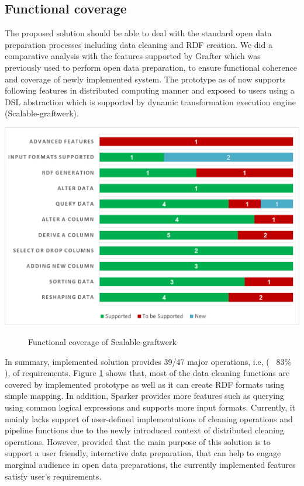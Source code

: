 \subsection{Functional coverage}
The proposed solution should be able to deal with the standard open data preparation processes including data cleaning and RDF creation. We did a comparative analysis with the features supported by Grafter which was previously used to perform open data preparation, to ensure functional coherence and coverage of newly implemented system.  The prototype as of now supports following features in distributed computing manner and exposed to users using a DSL abstraction which is supported by dynamic transformation execution engine (Scalable-graftwerk). 
\begin{center}
	\includegraphics[width=38em]{./Figures/functional-coverage-new}
	\begin{figure}[htbp]
    \caption{Functional coverage of Scalable-graftwerk}
    \label{fig:func-coverage}
	\end{figure}
\end{center}
 In summary, implemented solution provides 39/47 major operations, i.e, ( ~83\% ), of requirements. Figure \ref{fig:func-coverage} shows that, most of the data cleaning functions are covered by implemented prototype as well as it can create RDF formats using simple mapping. In addition, Sparker provides more features such as querying using common logical expressions and supports more input formats.   Currently, it mainly lacks support of user-defined implementations of cleaning operations and pipeline functions due to the newly introduced context of distributed cleaning operations. However, provided that the main purpose of this solution is to support a user friendly, interactive data preparation, that can help to engage marginal audience in open data preparations, the currently implemented features satisfy user's requirements. 

